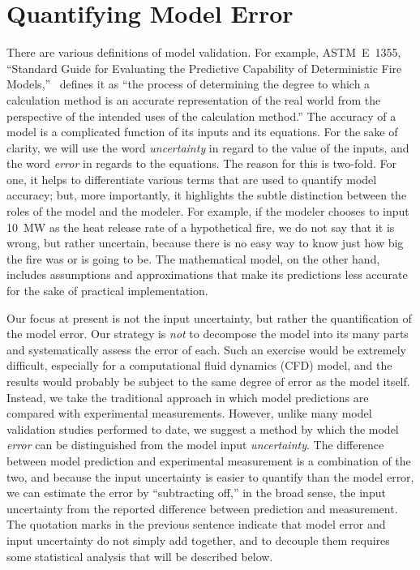 
\chapter{Quantifying Model Error}

There are various definitions of model validation.
For example, ASTM~E~1355, ``Standard Guide for Evaluating the Predictive Capability of
Deterministic Fire Models,''~\cite{ASTM:E1355} defines it as ``the process of determining the degree to which a calculation method
is an accurate representation of the real world from the perspective of the intended uses of the calculation method.''
The accuracy of a model is a complicated function of its inputs and its equations.
For the sake of clarity, we will use the word {\em uncertainty} in regard to the value of the inputs, and the word {\em error} in regards
to the equations. The reason for this is two-fold. For one,
it helps to differentiate various terms that are used to quantify model accuracy; but, more importantly, it highlights the subtle distinction between the roles of the model
and the modeler. For example, if the modeler chooses to input 10~MW as the heat release rate of a hypothetical fire, we do not say that it is wrong, but rather uncertain, because there
is no easy way to know just how big the fire was or is going to be. The mathematical model, on the other hand, includes assumptions and approximations that make its predictions less
accurate for the sake of practical implementation.

Our focus at present is not the input uncertainty, but rather the quantification of the model error.
Our strategy is {\em not} to decompose the model into its many parts and systematically assess
the error of each. Such an exercise would be extremely difficult, especially for a computational fluid dynamics (CFD) model, and the results would probably be subject to the same
degree of error as the model itself. Instead, we take the traditional approach in which model predictions are compared with experimental measurements. However, unlike many
model validation studies performed to date, we suggest a method by which the model {\em error} can be distinguished from the model input {\em uncertainty}. The difference
between model prediction and experimental measurement is a combination of the two, and because the input
uncertainty is easier to quantify than the model error, we can estimate the error by ``subtracting off,'' in the broad sense, the input uncertainty from the reported
difference between prediction and measurement. The quotation marks in the previous sentence indicate that model error and input uncertainty do not simply add together,
and to decouple them requires some statistical analysis that will be described below.



